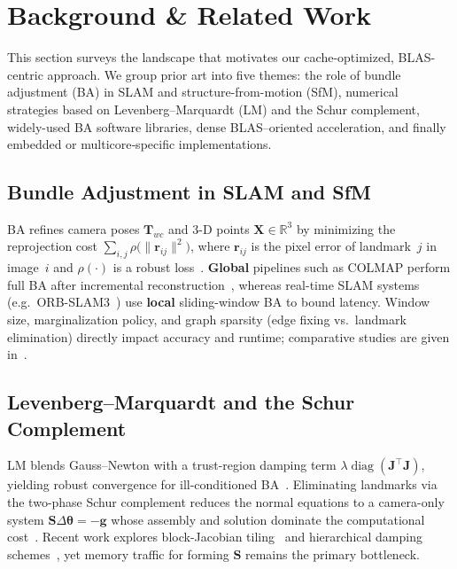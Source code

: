 \section{Background \& Related Work}
\label{sec:related}

This section surveys the landscape that motivates our cache-optimized, BLAS-centric
approach.  We group prior art into five themes: the role of bundle adjustment (BA)
in SLAM and structure-from-motion (SfM), numerical strategies based on
Levenberg–Marquardt (LM) and the Schur complement, widely-used BA software
libraries, dense BLAS–oriented acceleration, and finally embedded or
multicore‐specific implementations.

\subsection{Bundle Adjustment in SLAM and SfM}
\label{sec:ba_slam}

BA refines camera poses $\mathbf{T}_{wc}$ and 3-D points
$\mathbf{X}\!\in\!\mathbb R^{3}$ by minimizing the reprojection cost
$\sum_{i,j}\!\rho\!\bigl(\|\mathbf r_{ij}\|^{2}\bigr)$, where
$\mathbf r_{ij}$ is the pixel error of landmark~$j$ in image~$i$ and
$\rho(\cdot)$ is a robust loss~\cite{Hartley2003,Lourakis2009}.
%
\textbf{Global} pipelines such as COLMAP perform full BA after incremental
reconstruction~\cite{Schonberger2016}, whereas real-time SLAM systems
(e.g.\ ORB-SLAM3~\cite{MurArtal2021}) use \textbf{local} sliding-window BA to
bound latency.  Window size, marginalization policy, and graph sparsity
(edge fixing vs.\ landmark elimination) directly impact accuracy and runtime;
comparative studies are given in~\cite{Engel2018,Usenko2019,Pfrommer2020}.

\subsection{Levenberg--Marquardt and the Schur Complement}
\label{sec:lm_schur}

LM blends Gauss–Newton with a trust-region damping term
$\lambda\operatorname{diag}(\mathbf J^{\!\top}\mathbf J)$, yielding robust
convergence for ill-conditioned BA~\cite{Lourakis2005}.  Eliminating
landmarks via the two-phase Schur complement reduces the normal equations to
a camera-only system
$\mathbf S\Delta\boldsymbol\theta=-\mathbf g$ whose assembly and solution
dominate the computational cost~\cite{Agarwal2012,Chen2022}.  Recent work
explores block-Jacobian tiling~\cite{Merry2016} and hierarchical damping
schemes~\cite{Zhang2023}, yet memory traffic for forming $\mathbf S$
remains the primary bottleneck.

